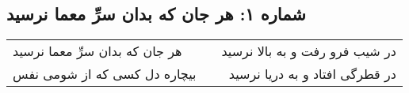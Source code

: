 \begin{center}
\section*{شماره ۱: هر جان که بدان سرِّ معما نرسید}
\label{sec:001}
\begin{longtable}{l p{0.5cm} r}
هر جان که بدان سرِّ معما نرسید
&&
در شیب فرو رفت و به بالا نرسید
\\
بیچاره دل کسی که از شومی نفس
&&
در قطرگی افتاد و به دریا نرسید
\\
\end{longtable}
\end{center}

